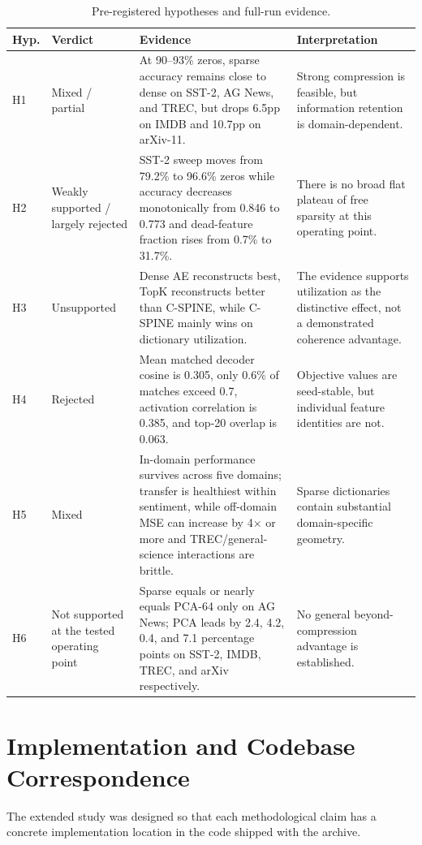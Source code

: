 \documentclass[conference]{IEEEtran}
\begin{document}
\begin{table}[t]
\caption{Pre-registered hypotheses and full-run evidence.}
\label{tab:hyp}
\centering
\begin{tabular}{p{0.6cm}p{3.4cm}p{7.2cm}p{5.6cm}}
\hline
\textbf{Hyp.} & \textbf{Verdict} & \textbf{Evidence} & \textbf{Interpretation} \\
\hline
H1 & Mixed / partial & At 90--93\% zeros, sparse accuracy remains close to dense on SST-2, AG News, and TREC, but drops 6.5pp on IMDB and 10.7pp on arXiv-11. & Strong compression is feasible, but information retention is domain-dependent. \\
H2 & Weakly supported / largely rejected & SST-2 sweep moves from 79.2\% to 96.6\% zeros while accuracy decreases monotonically from 0.846 to 0.773 and dead-feature fraction rises from 0.7\% to 31.7\%. & There is no broad flat plateau of free sparsity at this operating point. \\
H3 & Unsupported & Dense AE reconstructs best, TopK reconstructs better than C-SPINE, while C-SPINE mainly wins on dictionary utilization. & The evidence supports utilization as the distinctive effect, not a demonstrated coherence advantage. \\
H4 & Rejected & Mean matched decoder cosine is 0.305, only 0.6\% of matches exceed 0.7, activation correlation is 0.385, and top-20 overlap is 0.063. & Objective values are seed-stable, but individual feature identities are not. \\
H5 & Mixed & In-domain performance survives across five domains; transfer is healthiest within sentiment, while off-domain MSE can increase by 4$\times$ or more and TREC/general-science interactions are brittle. & Sparse dictionaries contain substantial domain-specific geometry. \\
H6 & Not supported at the tested operating point & Sparse equals or nearly equals PCA-64 only on AG News; PCA leads by 2.4, 4.2, 0.4, and 7.1 percentage points on SST-2, IMDB, TREC, and arXiv respectively. & No general beyond-compression advantage is established. \\
\hline
\end{tabular}
\end{table}

\section{Implementation and Codebase Correspondence}
The extended study was designed so that each methodological claim has a
concrete implementation location in the code shipped with the archive.
\end{document}
